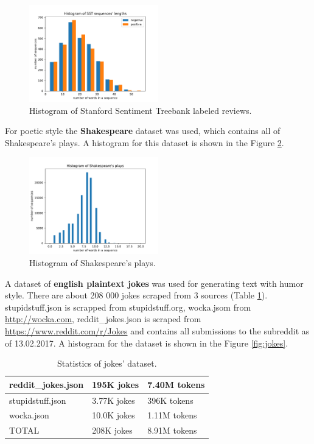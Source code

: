 \begin{figure}[hb]
  \centering
  \includegraphics[width=0.5\textwidth]{figures/sst.pdf}
  \caption{Histogram of Stanford Sentiment Treebank labeled reviews.}
  \label{fig:sst}
\end{figure}

For poetic style the \textbf{Shakespeare} dataset was used, which contains all of Shakespeare's plays. A histogram for this dataset is shown in the Figure \ref{fig:shakespeare}.

\begin{figure}[H]
  \centering
  \includegraphics[width=0.5\textwidth]{figures/shakespeare.pdf}
  \caption{Histogram of Shakespeare's plays.}
  \label{fig:shakespeare}
\end{figure}

A dataset of \textbf{english plaintext jokes} was used for generating text with humor style. There are about 208 000 jokes scraped from 3 sources (Table \ref{tab:jokes}). stupidstuff.json is scrapped from stupidstuff.org, wocka.jsom from \url{http://wocka.com}, reddit\_jokes.json is scraped from \url{https://www.reddit.com/r/Jokes} and contains all submissions to the subreddit as of 13.02.2017. A histogram for the dataset is shown in the Figure \ref{fig:jokes}.

\begin{table}[H]
\centering
 \begin{tabular}{|p{4cm}|p{3cm}|p{3cm}|} 
 \hline
 reddit\_jokes.json & 195K jokes & 7.40M tokens \\
 \hline
 stupidstuff.json & 3.77K jokes & 396K tokens \\
 \hline
 wocka.json & 10.0K jokes & 1.11M tokens \\
 \hline
 TOTAL & 208K jokes & 8.91M tokens \\
 \hline
 \end{tabular}
 \caption{Statistics of jokes' dataset.}
\label{tab:jokes}
\end{table}

